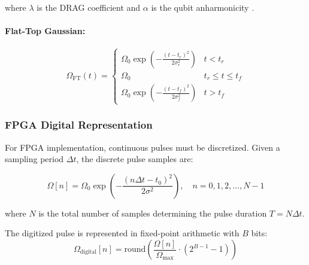 \documentclass[12pt,a4paper]{article}
\theoremstyle{definition}
\begin{document}
where $\lambda$ is the DRAG coefficient and $\alpha$ is the qubit anharmonicity \cite{motzoi2009simple}.

\paragraph{Flat-Top Gaussian:}
\begin{equation}
\Omega_{\text{FT}}(t) = 
\begin{cases}
\Omega_0 \exp\left(-\frac{(t-t_r)^2}{2\sigma_r^2}\right) & t < t_r \\
\Omega_0 & t_r \leq t \leq t_f \\
\Omega_0 \exp\left(-\frac{(t-t_f)^2}{2\sigma_f^2}\right) & t > t_f
\end{cases}
\label{eq:flattop}
\end{equation}

\subsubsection{FPGA Digital Representation}

For FPGA implementation, continuous pulses must be discretized. Given a sampling period $\Delta t$, the discrete pulse samples are:

\begin{equation}
\boxed{
\Omega[n] = \Omega_0 \exp\left(-\frac{(n\Delta t - t_0)^2}{2\sigma^2}\right), \quad n = 0, 1, 2, \ldots, N-1
}
\label{eq:discrete}
\end{equation}

where $N$ is the total number of samples determining the pulse duration $T = N\Delta t$.

The digitized pulse is represented in fixed-point arithmetic with $B$ bits:
\begin{equation}
\Omega_{\text{digital}}[n] = \text{round}\left(\frac{\Omega[n]}{\Omega_{\text{max}}} \cdot (2^{B-1} - 1)\right)
\label{eq:digital}
\end{equation}
\end{document}
